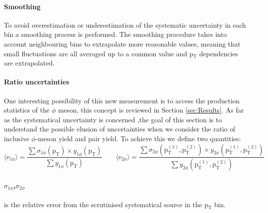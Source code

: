\paragraph{Smoothing}
To avoid overestimation or underestimation of the systematic uncertainty in each bin a smoothing process is performed. The smoothing procedure takes into account neighbouring bins to extrapolate more reasonable values, meaning that small fluctuations are all averaged up to a common value and p$_{\text{T}}$ dependencies are extrapolated.

\paragraph{Ratio uncertainties}
One interesting possibility of this new measurement is to access the production statistics of the $\phi$ meson, this concept is reviewed in Section \ref{sec:Results}. As far as the systematical uncertainty is concerned ,the goal of this section is to understand the possible elusion of uncertainties when we consider the ratio of inclusive $\phi$-meson yield and pair yield. To achieve this we define two quantities:
\begin{equation}
\langle \text{e}_{1\phi}\rangle = \frac{\sum \sigma_{1\phi}(\text{p}_{\text{T}}) \times y_{1\phi}(\text{p}_{\text{T}})}{\sum y_{1\phi}(\text{p}_{\text{T}})} \qquad \langle \text{e}_{2\phi}\rangle = \frac{\sum \sigma_{2\phi}(\text{p}_{\text{T}}^{(1)},\text{p}_{\text{T}}^{(2)}) \times y_{2\phi}(\text{p}_{\text{T}}^{(1)},\text{p}_{\text{T}}^{(2)})}{\sum y_{2\phi}(\text{p}_{\text{T}}^{(1)},\text{p}_{\text{T}}^{(2)})} 
\label{}
\end{equation}
\paragraph{$\sigma_{1\phi}$,$\sigma_{2\phi}$} is the relative error from the scrutinised systematical source in the p$_{\text{T}}$ bin.
